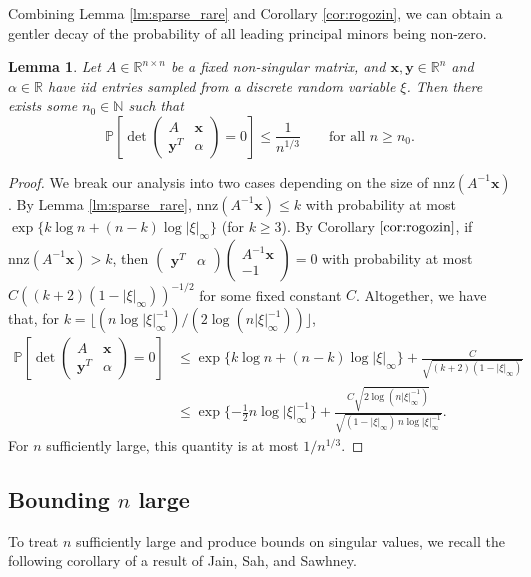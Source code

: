 \documentclass[reqno]{amsart}
\numberwithin{equation}{section}
\newtheorem{lemma}[theorem]{Lemma}
\begin{document}
Combining Lemma \ref{lm:sparse_rare} and Corollary \ref{cor:rogozin}, we can obtain a gentler decay of the probability of all leading principal minors being non-zero.

\begin{lemma}\label{lm:n_moderate}
Let $A \in \mathbb{R}^{n \times n}$ be a fixed non-singular matrix, and $\bm{x},\bm{y} \in \mathbb{R}^{n}$ and $\alpha \in \mathbb{R}$ have iid entries sampled from a discrete random variable $\xi$. Then there exists some $n_0 \in \mathbb{N}$ such that
\[\mathbb{P}\left[ \det  \begin{pmatrix} A & \bm{x} \\ \bm{y}^T & \alpha \end{pmatrix} = 0\right] \le  \frac{1}{n^{1/3}}  \qquad \text{for all } n \ge n_0.\]
\end{lemma}

\begin{proof}
We break our analysis into two cases depending on the size of $\mathrm{nnz}(A^{-1} \bm{x})$. By Lemma \ref{lm:sparse_rare}, $\mathrm{nnz}(A^{-1} \bm{x}) \le k$ with probability at most $\exp\{k \log n + (n-k) \log |\xi|_{\infty} \}$ (for $k \ge 3$). By Corollary $\ref{cor:rogozin}$, if $\mathrm{nnz}(A^{-1} \bm{x}) > k$, then $\begin{pmatrix} \bm{y}^T & \alpha \end{pmatrix} \begin{pmatrix} A^{-1} \bm{x} \\ -1 \end{pmatrix} = 0$ with probability at most $C ((k+2)(1-|\xi|_{\infty}))^{-1/2}$ for some fixed constant $C$. Altogether, we have that, for $k = \lfloor (n \log |\xi|^{-1}_{\infty})/(2\log(n|\xi|^{-1}_{\infty})) \rfloor$,
\begin{align*}\mathbb{P}\left[ \det  \begin{pmatrix} A & \bm{x} \\ \bm{y}^T & \alpha \end{pmatrix} = 0\right] &\le \exp\{k \log n + (n-k) \log |\xi|_{\infty} \} + \frac{C}{\sqrt{(k+2)(1-|\xi|_{\infty})}}\\
&\le \exp\{ -\tfrac{1}{2} n \log |\xi|^{-1}_{\infty}\} + \frac{C \sqrt{2 \log(n |\xi|^{-1}_\infty)}}{\sqrt{(1-|\xi|_{\infty}) \, n \log |\xi|^{-1}_\infty}}.\end{align*}
For $n$ sufficiently large, this quantity is at most $1/n^{1/3}$.
\end{proof}

\subsection{Bounding $n$ large} To treat $n$ sufficiently large and produce bounds on singular values, we recall the following corollary of a result of Jain, Sah, and Sawhney.
\end{document}
